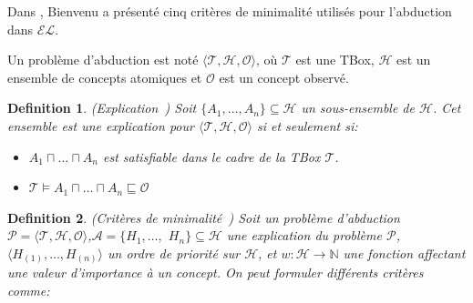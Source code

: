 \documentclass{article}
\newtheorem{mydef}{Definition}
\begin{document}
Dans \cite{bienvenu-kr08}, Bienvenu a présenté cinq critères de minimalité utilisés pour l'abduction dans $\mathcal{EL}$.  


Un problème d'abduction est noté $ \langle \mathcal{T}, \mathcal{H}, \mathcal{O}\rangle$, où $\mathcal{T}$ est une TBox, $\mathcal{H}$ est un ensemble de concepts atomiques et $\mathcal{O}$ est un
concept observé.

\begin{mydef}{(Explication~\cite{bienvenu-kr08})}
Soit $\{ A_1,\dots,A_n \} \subseteq \mathcal{H}$ un sous-ensemble de $\mathcal{H}$. Cet ensemble est une explication pour $ \langle \mathcal{T}, \mathcal{H}, \mathcal{O}\rangle$ si et seulement si:
\begin{itemize}
\item  $A_1 \sqcap \dots \sqcap A_n$ est satisfiable dans le cadre de la TBox $\mathcal{T}$.
\item $\mathcal{T}  \vDash  A_1 \sqcap \dots \sqcap A_n \sqsubseteq \mathcal{O}$
\end{itemize}

\end{mydef}


\begin{mydef}{(Critères de minimalité~\cite{bienvenu-kr08})}
Soit un problème d'abduction $\mathcal{P}=\langle \mathcal{T},\mathcal{H}, \mathcal{O}\rangle$,$\mathcal{A}=\{H_1,\dots,$ $H_n \} \subseteq \mathcal{H}$ une explication du problème $\mathcal{P}$,
$\langle H_{(1)},\dots,H_{(n)}\rangle$ un ordre de priorité sur $\mathcal{H}$,
et $w:\mathcal{H}\rightarrow \mathbb{N}$ une fonction affectant une valeur d'importance à un concept. On peut formuler différents critères comme:
 \end{mydef}
\end{document}

